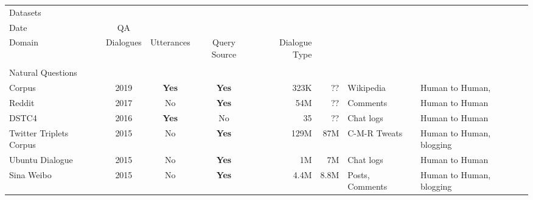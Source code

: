 \setlength{\tabcolsep}{7pt}
\renewcommand{\arraystretch}{1.1}
\begin{landscape}
\begin{longtable}[c]{@{}lcccrrll@{}}
\toprule
Datasets                                                                      & \begin{tabular}[c]{@{}c@{}}Release \\ Date\end{tabular} & QA           & \begin{tabular}[c]{@{}c@{}}Open \\ Domain\end{tabular} & Dialogues     & Utterances & Query Source    & Dialogue Type            \\* \midrule
\endhead
\bottomrule
\endfoot
\endlastfoot
\begin{tabular}[c]{@{}l@{}}Google \\ Natural Questions \\ Corpus\end{tabular} & 2019                                                    & \textbf{Yes} & \textbf{Yes}                                           & 323K & ??         & Wikipedia       & Human to Human,          \\
Reddit                                                                        & 2017                                                    & No           & \textbf{Yes}                                           & 54M  & ??         & Comments        & Human to Human           \\
DSTC4                                                                         & 2016                                                    & \textbf{Yes} & No                                                     & 35            & ??         & Chat logs       & Human to Human           \\
Twitter Triplets Corpus                                                       & 2015                                                    & No           & \textbf{Yes}                                           & 129M & 87M        & C-M-R Tweats    & Human to Human, blogging \\
Ubuntu Dialogue                                                               & 2015                                                    & No           & \textbf{Yes}                                           & 1M   & 7M         & Chat logs       & Human to Human           \\
Sina Weibo                                                                    & 2015                                                    & No           & \textbf{Yes}                                           & 4.4M & 8.8M       & Posts, Comments & Human to Human, blogging \\

\end{longtable}
\end{landscape}
